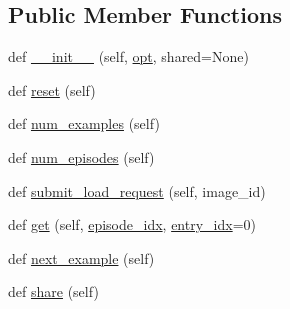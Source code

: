 \subsection*{Public Member Functions}
\begin{DoxyCompactItemize}
\item 
def \hyperlink{classparlai_1_1tasks_1_1vqa__v2_1_1agents_1_1OeTeacher_ae97aade64cf9108a8cb022721a13ebd4}{\+\_\+\+\_\+init\+\_\+\+\_\+} (self, \hyperlink{classparlai_1_1core_1_1agents_1_1Teacher_a3ce6243860ce978a897922863ed32fa4}{opt}, shared=None)
\item 
def \hyperlink{classparlai_1_1tasks_1_1vqa__v2_1_1agents_1_1OeTeacher_aa20e871a24dbb851310b357a58ed4b84}{reset} (self)
\item 
def \hyperlink{classparlai_1_1tasks_1_1vqa__v2_1_1agents_1_1OeTeacher_a1285cd818eafe9267f54049cc77d9506}{num\+\_\+examples} (self)
\item 
def \hyperlink{classparlai_1_1tasks_1_1vqa__v2_1_1agents_1_1OeTeacher_a98b9f8bc131ddb23d185811a479dc742}{num\+\_\+episodes} (self)
\item 
def \hyperlink{classparlai_1_1tasks_1_1vqa__v2_1_1agents_1_1OeTeacher_afc1a8af21f49e95d90ee64af6c560f1b}{submit\+\_\+load\+\_\+request} (self, image\+\_\+id)
\item 
def \hyperlink{classparlai_1_1tasks_1_1vqa__v2_1_1agents_1_1OeTeacher_a75d45765b191394b0defbbe3b8bb09e0}{get} (self, \hyperlink{classparlai_1_1core_1_1teachers_1_1FixedDialogTeacher_afd4ebab8063eb42d182d30a1a41f133e}{episode\+\_\+idx}, \hyperlink{classparlai_1_1core_1_1teachers_1_1FixedDialogTeacher_ae3201b15f3c3b46a2f3511bad9b43e7d}{entry\+\_\+idx}=0)
\item 
def \hyperlink{classparlai_1_1tasks_1_1vqa__v2_1_1agents_1_1OeTeacher_aa1bd8754bec6bafbc67231d5fecb14b6}{next\+\_\+example} (self)
\item 
def \hyperlink{classparlai_1_1tasks_1_1vqa__v2_1_1agents_1_1OeTeacher_a578dc1b9b99fa81231ccb16975013228}{share} (self)
\end{DoxyCompactItemize}
